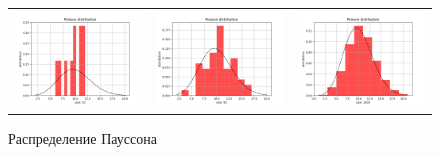\documentclass[../main.tex]{subfiles}
\begin{document}
	\begin{figure}[H]
		\centering
		\begin{tabular}{ccc}
			\includegraphics[width=55mm, height =0.25\textheight]{figures/PoissonNumber10.png} 
			&
			\includegraphics[width=55mm, height =0.25\textheight]{figures/PoissonNumber50.png}
			&
			\includegraphics[width=55mm, height =0.25\textheight]{figures/PoissonNumber1000.png}
		\end{tabular}
		\caption{Распределение Пауссона} 
		\label{fig:normal}
	\end{figure}
	
\end{document}
